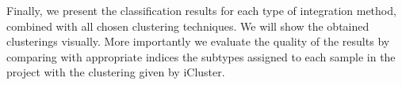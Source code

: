 Finally, we present the classification results for each type of integration method, combined with all chosen clustering techniques. We will show the obtained clusterings visually. More importantly we evaluate the quality of the results by comparing with appropriate indices the subtypes assigned to each sample in the project with the clustering given by iCluster.